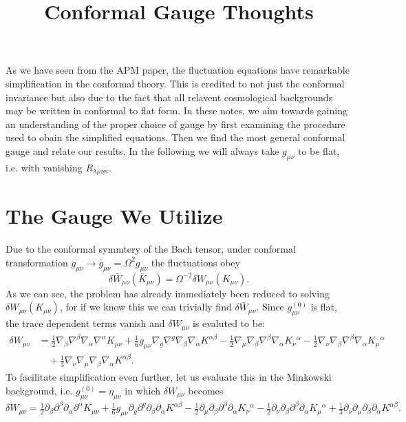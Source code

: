 \documentclass[10pt,letterpaper]{article}
\title{Conformal Gauge Thoughts}
\date{}
\begin{document}
\maketitle
As we have seen from the APM paper, the fluctuation equations have remarkable simplification in the conformal theory. This is credited to not just the conformal invariance but also due to the fact that all relavent cosmological backgrounds may be written in conformal to flat form. In these notes, we aim towards gaining an understanding of the proper choice of gauge by first examining the procedure used to obain the simplified equations. Then we find the most general conformal gauge and relate our results. In the following we will always take $g_{\mu\nu}$ to be flat, i.e. with vanishing $R_{\lambda\mu\nu\kappa}$. 
\section*{The Gauge We Utilize}
\noindent
Due to the conformal symmtery of the Bach tensor, under conformal transformation $g_{\mu\nu}\to \bar g_{\mu\nu} = \Omega^2 g_{\mu\nu}$ the fluctuations obey
\begin{equation}
	\delta \bar W_{\mu\nu}(\bar K_{\mu\nu}) = \Omega^{-2}\delta W_{\mu\nu}(K_{\mu\nu}).
\end{equation}
As we can see, the problem has already immediately been reduced to solving $\delta W_{\mu\nu}(K_{\mu\nu})$, for if we know this we can trivially find $\delta\bar W_{\mu\nu}$. 
 Since $g^{(0)}_{\mu\nu}$ is flat, the trace dependent terms vanish and $\delta W_{\mu\nu}$ is evaluted to be:
\begin{align}
\delta W_{\mu\nu} &= 
\tfrac{1}{2} {\nabla}_{\beta}{\nabla}^{\beta}{\nabla}_{\alpha}{\nabla}^{\alpha}K_{\mu \nu} + \tfrac{1}{6} g_{\mu \nu} {\nabla}_{g}{\nabla}^{g}{\nabla}_{\beta}{\nabla}_{\alpha}K^{\alpha \beta} -  \tfrac{1}{2} {\nabla}_{\mu}{\nabla}_{\beta}{\nabla}^{\beta}{\nabla}_{\alpha}K_{\nu}{}^{\alpha} -  \tfrac{1}{2} {\nabla}_{\nu}{\nabla}_{\beta}{\nabla}^{\beta}{\nabla}_{\alpha}K_{\mu}{}^{\alpha}\nonumber  \\
&\quad+ \tfrac{1}{3} {\nabla}_{\nu}{\nabla}_{\mu}{\nabla}_{\beta}{\nabla}_{\alpha}K^{\alpha \beta}.
\end{align}
To facilitate simplification even further, let us evaluate this in the Minkowski background, i.e.  $g^{(0)}_{\mu\nu}=\eta_{\mu\nu}$ in which $\delta W_{\mu\nu}$ becomes
\begin{equation}
\delta W_{\mu\nu} = 
\tfrac{1}{2} {\partial}_{\beta}{\partial}^{\beta}{\partial}_{\alpha}{\partial}^{\alpha}K_{\mu \nu} + \tfrac{1}{6} g_{\mu \nu} {\partial}_{g}{\partial}^{g}{\partial}_{\beta}{\partial}_{\alpha}K^{\alpha \beta} -  \tfrac{1}{2} {\partial}_{\mu}{\partial}_{\beta}{\partial}^{\beta}{\partial}_{\alpha}K_{\nu}{}^{\alpha} -  \tfrac{1}{2} {\partial}_{\nu}{\partial}_{\beta}{\partial}^{\beta}{\partial}_{\alpha}K_{\mu}{}^{\alpha} + \tfrac{1}{3} {\partial}_{\nu}{\partial}_{\mu}{\partial}_{\beta}{\partial}_{\alpha}K^{\alpha \beta}.
\end{equation}
\end{document}

